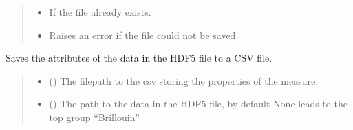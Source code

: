 \documentclass[letterpaper,10pt,english]{sphinxmanual}
\begin{document}
\begin{fulllineitems}
\begin{fulllineitems}
\begin{quote}
\begin{description}
\begin{itemize}
\item {} 
\sphinxAtStartPar
{} \textendash{} If the file already exists.

\item {} 
\sphinxAtStartPar
{\hyperref[\detokenize{_autosummary/HDF5_BLS.WrapperError:HDF5_BLS.WrapperError}]{}} \textendash{} Raises an error if the file could not be saved

\end{itemize}

\end{description}\end{quote}

\end{fulllineitems}


\begin{fulllineitems}
\label{\detokenize{_autosummary/HDF5_BLS.wrapper:HDF5_BLS.wrapper.Wrapper.save_properties_csv}}
\pysigstartsignatures
\pysiglinewithargsret
{}
{\sphinxparamcomma {}}
{}
\pysigstopsignatures
\sphinxAtStartPar
Saves the attributes of the data in the HDF5 file to a CSV file.
\begin{quote}\begin{description}
\begin{itemize}
\item {} 
\sphinxAtStartPar
{} () \textendash{} The filepath to the csv storing the properties of the measure.

\item {} 
\sphinxAtStartPar
{} (\sphinxstyleliteralemphasis{\sphinxupquote{, }}) \textendash{} The path to the data in the HDF5 file, by default None leads to the top group “Brillouin”

\end{itemize}


\end{description}
\end{quote}
\end{fulllineitems}
\end{fulllineitems}
\end{document}
